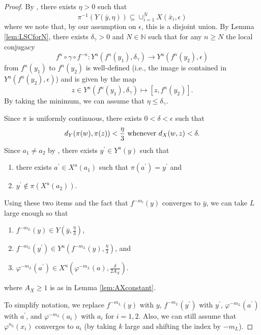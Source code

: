 \documentclass{amsart}
\newcommand{\N}{\mathbb{N}}
\theoremstyle{plain}
\theoremstyle{definition}
\theoremstyle{remark}
\begin{document}
\begin{proof}
By \cite[Lemma 2.5.9]{MR3243636}, there exists $\eta>0$ such that
\[
\pi^{-1}(Y(\bar{y}, \eta)) \subseteq \cup_{i=1}^{\bar{N}} X(\bar{x}_i, \epsilon)
\]
where we note that, by our assumption on $\epsilon$, this is a disjoint union. By Lemma \ref{lem:LSCforN}, there exists $\delta_{\gamma}>0$ and $N\in \N$ such that for any $n\ge N$ the local conjugacy 
\[  f^n \circ \gamma \circ f^{-n} : Y^u( f^n(y_1), \delta_{\gamma}) \rightarrow Y^u(f^n(y_2), \epsilon) \]
from $f^n(y_1)$ to $f^n(y_2)$ is well-defined (i.e., the image is contained in $Y^u(f^n(y_2), \epsilon)$) and is given by the map
\[ z \in Y^u( f^n(y_1), \delta_{\gamma}) \mapsto [z, f^n(y_2)]. \]
By taking the minimum, we can assume that $\eta \le \delta_{\gamma}$.

Since $\pi$ is uniformly continuous, there exists $0<\delta< \epsilon$ such that
\[
d_Y(\pi(w), \pi(z))< \frac{\eta}{3} \hbox{ whenever }d_X(w,z)< \delta.
\]
Since $a_1 \neq a_2$ by \cite[Lemma 4.15]{fisher13}, there exists $y^{\prime} \in Y^u(y)$ such that 
\begin{enumerate}
\item there exists $a^{\prime} \in X^u(a_1)$ such that $\pi(a^{\prime})=y^{\prime}$ and
\item $y^{\prime} \not\in \pi(X^u(a_2))$.
\end{enumerate}
Using these two items and the fact that $f^{-m_l}(y)$ converges to $\bar{y}$, we can take $L$ large enough so that 
\begin{enumerate}
\item $f^{-m_{L}}(y) \in Y(\bar{y}, \frac{\eta}{3} )$, 
\item $f^{-m_{L}}(y^{\prime}) \in Y^u(f^{-m_{L}}(y), \frac{\eta}{3})$, and
\item $\varphi^{-m_L}(a^{\prime}) \in X^u\left(\varphi^{-m_L}(a), \frac{\delta}{2A_X}\right)$.
\end{enumerate}
where $A_X \ge 1$ is as in Lemma \ref{lem:AXconstant}.

To simplify notation, we replace $f^{-m_L}(y)$ with $y$, $f^{-m_L}(y^{\prime})$ with $y^{\prime}$, $\varphi^{-m_L}(a^{\prime})$ with $a^{\prime}$, and $\varphi^{-m_{L}}(a_i)$ with $a_i$ for $i=1,2$. Also, we can still assume that $\varphi^{n_k}(x_i)$ converges to $a_i$ (by taking $k$ large and shifting the index by $-m_L$). 


\end{proof}
\end{document}
